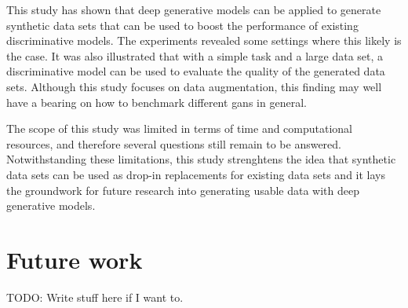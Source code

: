 This study has shown that deep generative models can be applied to generate synthetic data sets that can be used to boost the performance of existing discriminative models. The experiments revealed some settings where this likely is the case. It was also illustrated that with a simple task and a large data set, a discriminative model can be used to evaluate the quality of the generated data sets. Although this study focuses on data augmentation, this finding may well have a bearing on how to benchmark different \acrshort{gans} in general. 

The scope of this study was limited in terms of time and computational resources, and therefore several questions still remain to be answered. Notwithstanding these limitations, this study strenghtens the idea that synthetic data sets can be used as drop-in replacements for existing data sets and it lays the groundwork for future research into generating usable data with deep generative models.

\section{Future work}
TODO: Write stuff here if I want to.
